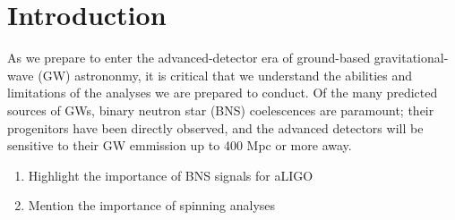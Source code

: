 \section{Introduction}

As we prepare to enter the advanced-detector era of ground-based gravitational-wave (GW) astrononmy, it is critical that we understand the abilities and limitations of the analyses we are prepared to conduct.  Of the many predicted sources of GWs, binary neutron star (BNS) coelescences are paramount; their progenitors have been directly observed, and the advanced detectors will be sensitive to their GW emmission up to 400 Mpc or more away\cite{2013arXiv1304.0670L}.


\begin{enumerate}
\item Highlight the importance of BNS signals for aLIGO
\item Mention the importance of spinning analyses
\end{enumerate}